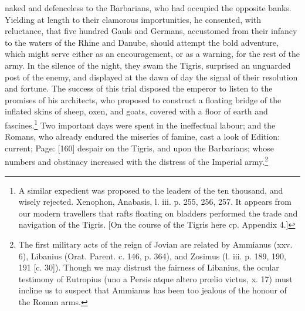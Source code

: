 naked and defenceless to the Barbarians, who had occupied the opposite banks. Yielding at length to their clamorous importunities, he consented, with reluctance, that five hundred Gauls and Germans, accustomed from their infancy to the waters of the Rhine and Danube, should attempt the bold adventure, which might serve either as an encouragement, or as a warning, for the rest of the army. In the silence of the night, they swam the Tigris, surprised an unguarded post of the enemy, and displayed at the dawn of day the signal of their resolution and fortune. The success of this trial disposed the emperor to listen to the promises of his architects, who proposed to construct a floating bridge of the inflated skins of sheep, oxen, and goats, covered with a floor of earth and fascines.\footnote{A similar expedient was proposed to the leaders of the ten thousand, and wisely rejected. Xenophon, Anabasis, l. iii. p. 255, 256, 257. It appears from our modern travellers that rafts floating on bladders performed the trade and navigation of the Tigris. [On the course of the Tigris here cp. Appendix 4.]} Two important days were spent in the ineffectual labour; and the Romans, who already endured the miseries of famine, cast a look of Edition: current; Page: [160] despair on the Tigris, and upon the Barbarians; whose numbers and obstinacy increased with the distress of the Imperial army.\footnote{The first military acts of the reign of Jovian are related by Ammianus (xxv. 6), Libanius (Orat. Parent. c. 146, p. 364), and Zosimus (l. iii. p. 189, 190, 191 [c. 30]). Though we may distrust the fairness of Libanius, the ocular testimony of Eutropius (uno a Persis atque altero prœlio victus, x. 17) must incline us to suspect that Ammianus has been too jealous of the honour of the Roman arms.}

